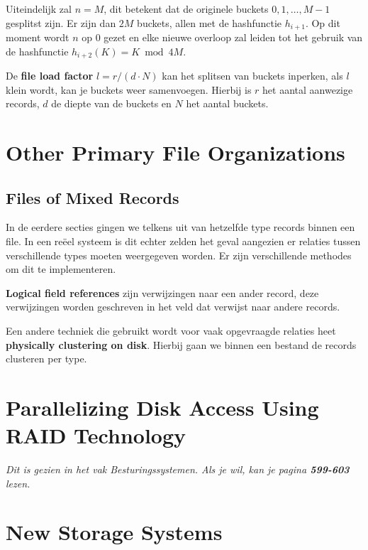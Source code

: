 Uiteindelijk zal $n=M$, dit betekent dat de originele buckets $0,1,\dots,M-1$ gesplitst zijn. Er zijn dan $2M$ buckets, allen met de hashfunctie $h_{i+1}$. Op dit moment wordt $n$ op 0 gezet en elke nieuwe overloop zal leiden tot het gebruik van de hashfunctie $h_{i+2}(K) = K \bmod 4M$.

De \textbf{file load factor} $l = r / (d \cdot N)$ kan het splitsen van buckets inperken, als $l$ klein wordt, kan je buckets weer samenvoegen. Hierbij is $r$ het aantal aanwezige records, $d$ de diepte van de buckets en $N$ het aantal buckets.



\section{Other Primary File Organizations}
\subsection{Files of Mixed Records}
In de eerdere secties gingen we telkens uit van hetzelfde type records binnen een file. In een re\"eel systeem is dit echter zelden het geval aangezien er relaties tussen verschillende types moeten weergegeven worden. Er zijn verschillende methodes om dit te implementeren.

\textbf{Logical field references} zijn verwijzingen naar een ander record, deze verwijzingen worden geschreven in het veld dat verwijst naar andere records.

Een andere techniek die gebruikt wordt voor vaak opgevraagde relaties heet \textbf{physically clustering on disk}. Hierbij gaan we binnen een bestand de records clusteren per type.



\section{Parallelizing Disk Access Using RAID Technology}
\textit{Dit is gezien in het vak Besturingssystemen. Als je wil, kan je pagina \textbf{599-603} lezen.}



\section{New Storage Systems}
